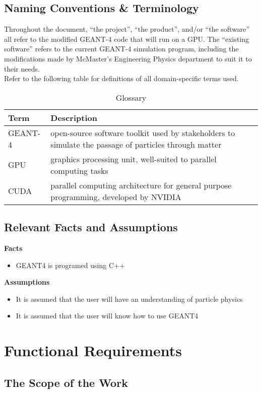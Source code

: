 \documentclass[12pt]{article}
\begin{document}
\subsection{Naming Conventions \& Terminology} %
Throughout the document, ``the project'', ``the product'', and/or ``the software'' all refer to the modified GEANT-4 code that will run on a GPU. The ``existing software'' refers to the current GEANT-4 simulation program, including the modifications made by McMaster's Engineering Physics department to suit it to their needs.\\

Refer to the following table for definitions of all domain-specific terms used.\\

\begin{table}[h]
\centering
\begin{tabularx}{\textwidth}{lX}
\hline
Term & Description\\
\hline
GEANT-4 & open-source software toolkit used by stakeholders to simulate the passage of particles through matter\\
GPU & graphics processing unit, well-suited to parallel computing tasks\\
CUDA & parallel computing architecture for general purpose programming, developed by NVIDIA\\
\hline
\end{tabularx}
\caption{Glossary}
\end{table}

\subsection{Relevant Facts and Assumptions} %
\textbf{Facts}
\begin{itemize}
	\item GEANT4 is programed using C++
\end{itemize}
\textbf{Assumptions}
 \begin{itemize}
	\item It is assumed that the user will have an understanding of particle physics
	\item It is assumed that the user will know how to use GEANT4
\end{itemize}
\section{Functional Requirements}
\subsection{The Scope of the Work} %
\end{document}
